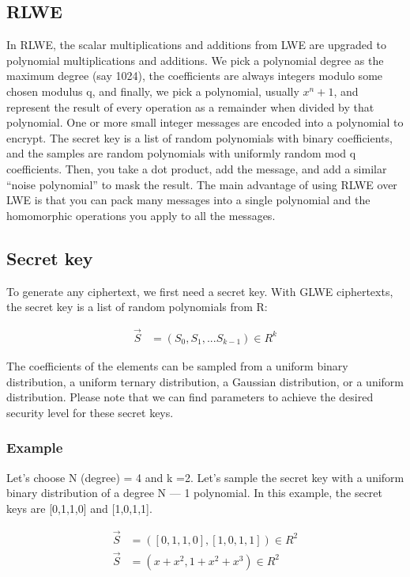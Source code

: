 \documentclass{techrep}
\theoremstyle{definition}
\theoremstyle{plain}
\begin{document}
\subsection{RLWE}
In RLWE, the scalar multiplications and additions from LWE are upgraded to polynomial multiplications and additions. We pick a polynomial degree as the maximum degree (say 1024), the coefficients are always integers modulo some chosen modulus q, and finally, we pick a polynomial, usually $x^n+1$, and represent the result of every operation as a remainder when divided by that polynomial. One or more small integer messages are encoded into a polynomial to encrypt. The secret key is a list of random polynomials with binary coefficients, and the samples are random polynomials with uniformly random mod q coefficients. Then, you take a dot product, add the message, and add a similar “noise polynomial” to mask the result. The main advantage of using RLWE over LWE is that you can pack many messages into a single polynomial and the homomorphic operations you apply to all the messages. 


	\subsection{Secret key}
To generate any ciphertext, we first need a secret key. With  GLWE ciphertexts, the secret key is a list of 
 random polynomials from R:

	\begin{align*}
		\overrightarrow{S} &= (S_0,S_1,...S_{k-1}) \in R^k
	\end{align*}

The coefficients of the elements can be sampled from a uniform binary distribution, a uniform ternary distribution, a Gaussian distribution, or a uniform distribution. Please note that we can find parameters to achieve the desired security level for these secret keys.

\subsubsection{Example}

Let’s choose N (degree) = 4 and k =2. Let's sample the secret key with a uniform binary distribution of a degree N — 1 polynomial. In this example, the secret keys are [0,1,1,0] and [1,0,1,1].

\begin{align*} 
\overrightarrow{S} &= ([0,1,1,0],[1,0,1,1]) \in R^2 \\ 
\overrightarrow{S} &= (x + x^2,1+x^2+x^3) \in R^2 \\ 
\end{align*}
\end{document}
